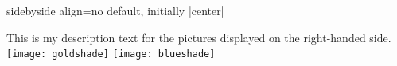 \begin{docTcbKey}[][doc updated=2015-02-06]{sidebyside align}{=}{no default, initially |center|}
\begin{dispExample}
\begin{tcolorbox}[adjusted title=bottom seam,sidebyside align=bottom seam]
  This is my description text for the pictures displayed on the right-handed side.
  \tcblower
  \texttt{[image: goldshade]}%
  \texttt{[image: blueshade]}
\end{tcolorbox}
\end{dispExample}
\end{docTcbKey}